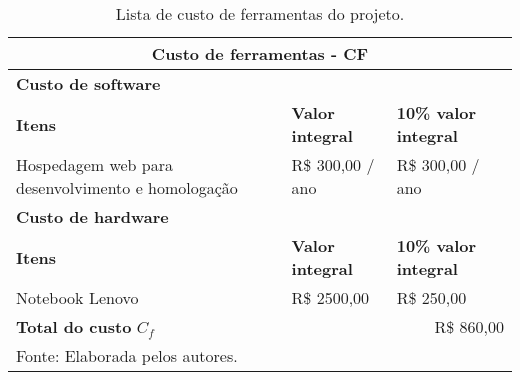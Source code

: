                 \noindent{\color{red}{Exemplo: }}
            
                \begin{longtable}{|p{6cm}|p{4cm}|p{4cm}|}
                    
                    \caption[Lista de custo de ferramentas do projeto.]{Lista de custo de ferramentas do projeto.}
                    
                    \hline
                    
                    \multicolumn{3}{|c|}{
                        \textbf{Custo de ferramentas - CF} \cellcolor{cinza_claro}
                    } \\ \hline
                    
                    \multicolumn{3}{|l|}{
                        \textbf{Custo de software} \cellcolor{cinza_claro}
                    } \\ \hline
                    
                    \textbf{Itens} \cellcolor{cinza_claro} &
                    \textbf{Valor integral} \cellcolor{cinza_claro} &
                    \textbf{10\% valor integral} \cellcolor{cinza_claro} \\ \hline
                    
                    Hospedagem web para desenvolvimento e homologação &
                    R\$ 300,00 / ano & R\$ 300,00 / ano
                    \\ \hline
                    
                    
                    \multicolumn{3}{|l|}{
                        \textbf{Custo de hardware} \cellcolor{cinza_claro}
                    } \\ \hline
                    
                    \textbf{Itens} \cellcolor{cinza_claro} &
                    \textbf{Valor integral} \cellcolor{cinza_claro} &
                    \textbf{10\% valor integral} \cellcolor{cinza_claro} \\ \hline
 
                    Notebook Lenovo &
                    R\$ 2500,00 
                    & R\$ 250,00 
                    \\ \hline
                    
                    \multicolumn{1}{|l|}{
                        \textbf{Total do custo } $C_f$ \cellcolor{cinza_claro}
                    } & 
                    \multicolumn{2}{|r|}{
                        \textbf{} \cellcolor{cinza_claro}
                        R\$ 860,00
                    } \\ \hline
                
                    \multicolumn{3}{l}{Fonte: Elaborada pelos autores.}
                    
                \end{longtable}
            

